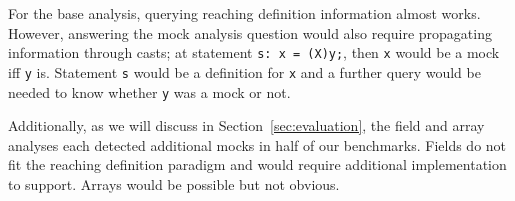 For the base analysis, querying reaching definition information almost works. However, answering the mock analysis question would also require propagating information through casts; at statement {\tt s: x = (X)y;}, then {\tt x} would be a mock iff {\tt y} is. Statement {\tt s} would be a definition for {\tt x} and a further query would be needed to know whether {\tt y} was a mock or not.

Additionally, as we will discuss in Section~\ref{sec:evaluation}, the field and array analyses each detected additional mocks in half of our benchmarks. Fields do not fit the reaching definition paradigm and would require additional implementation to support. Arrays would be possible but not obvious.

